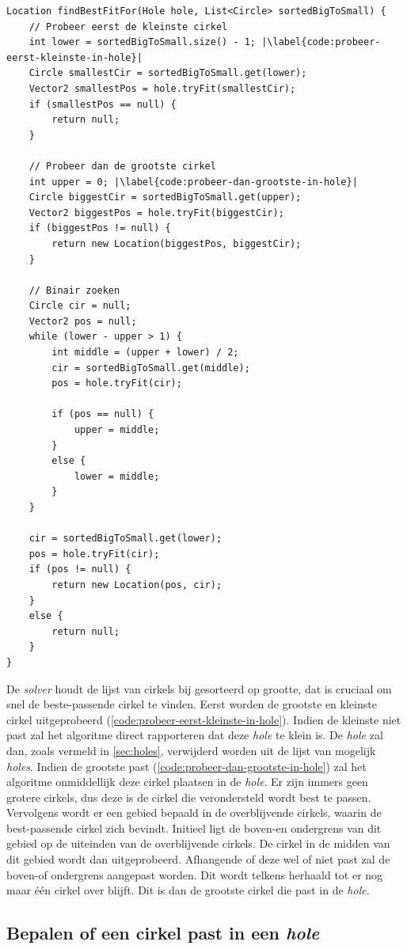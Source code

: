 \documentclass[12pt,a4paper,oneside]{book}
\begin{document}
\begin{lstlisting}
Location findBestFitFor(Hole hole, List<Circle> sortedBigToSmall) {
	// Probeer eerst de kleinste cirkel
	int lower = sortedBigToSmall.size() - 1; |\label{code:probeer-eerst-kleinste-in-hole}|
	Circle smallestCir = sortedBigToSmall.get(lower);
	Vector2 smallestPos = hole.tryFit(smallestCir);
	if (smallestPos == null) {
		return null;
	}

	// Probeer dan de grootste cirkel
	int upper = 0; |\label{code:probeer-dan-grootste-in-hole}|
	Circle biggestCir = sortedBigToSmall.get(upper);
	Vector2 biggestPos = hole.tryFit(biggestCir);
	if (biggestPos != null) {
		return new Location(biggestPos, biggestCir);
	}

	// Binair zoeken
	Circle cir = null;
	Vector2 pos = null;
	while (lower - upper > 1) {
		int middle = (upper + lower) / 2;
		cir = sortedBigToSmall.get(middle);
		pos = hole.tryFit(cir);

		if (pos == null) {
			upper = middle;
		}
		else {
			lower = middle;
		}
	}

	cir = sortedBigToSmall.get(lower);
	pos = hole.tryFit(cir);
	if (pos != null) {
		return new Location(pos, cir);
	}
	else {
		return null;
	}
}
\end{lstlisting}

De \textit{solver} houdt de lijst van cirkels bij gesorteerd op grootte, dat is cruciaal om snel de beste-passende cirkel te vinden.
Eerst worden de grootste en kleinste cirkel uitgeprobeerd (\autoref{code:probeer-eerst-kleinste-in-hole}).
Indien de kleinste niet past zal het algoritme direct rapporteren dat deze \textit{hole} te klein is.
De \textit{hole} zal dan, zoals vermeld in \autoref{sec:holes}, verwijderd worden uit de lijst van mogelijk \textit{holes}.
Indien de grootste past (\autoref{code:probeer-dan-grootste-in-hole}) zal het algoritme onmiddellijk deze cirkel plaatsen in de \textit{hole}.
Er zijn immers geen grotere cirkels, dus deze is de cirkel die verondersteld wordt best te passen.
Vervolgens wordt er een gebied bepaald in de overblijvende cirkels, waarin de best-passende cirkel zich bevindt.
Initieel ligt de boven-en ondergrens van dit gebied op de uiteinden van de overblijvende cirkels.
De cirkel in de midden van dit gebied wordt dan uitgeprobeerd.
Afhangende of deze wel of niet past zal de boven-of ondergrens aangepast worden.
Dit wordt telkens herhaald tot er nog maar één cirkel over blijft.
Dit is dan de grootste cirkel die past in de \textit{hole}.

\subsection{Bepalen of een cirkel past in een \textit{hole}} \label{subsec:bepalen-of-een-cirkel-past-in-hole}
\end{document}
